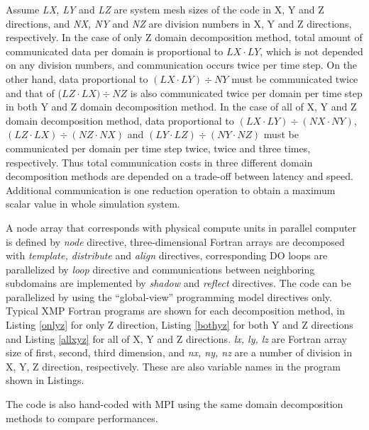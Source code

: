 \documentclass[graybox]{svmult}
\begin{document}
Assume {\it LX, LY} and {\it LZ} are system mesh sizes of the code in X, Y and Z directions, and {\it NX, NY} and {\it NZ} are division numbers in X, Y and Z directions, respectively. In the case of only Z domain decomposition method, total amount of communicated data per domain is proportional to $LX \cdot LY$, which is not depended on any division numbers, and communication occurs twice per time step. On the other hand, data proportional to $(LX \cdot LY) \div NY$ must be communicated twice and that of ($LZ \cdot LX) \div NZ$ is also communicated twice per domain per time step in both Y and Z domain decomposition method. In the case of all of X, Y and Z domain decomposition method, data proportional to $(LX \cdot LY) \div (NX \cdot NY)$,  $(LZ \cdot LX) \div (NZ \cdot NX)$ and $(LY \cdot LZ) \div (NY \cdot NZ)$ must be communicated per domain per time step twice, twice and three times, respectively. Thus total communication costs in three different domain decomposition methods are depended on a trade-off between latency and speed. Additional communication is one reduction operation to obtain a maximum scalar value in whole simulation system.

A node array that corresponds with physical compute units in parallel computer is defined by {\it node} directive, three-dimensional Fortran arrays are decomposed with {\it template, distribute} and {\it align} directives, corresponding DO loops are parallelized by {\it loop} directive and communications between neighboring subdomains are implemented by {\it shadow} and {\it reflect} directives. The code can be parallelized by using the ``global-view'' programming model directives only. Typical XMP Fortran programs are shown for each decomposition method,  in Listing \ref{onlyz} for only Z direction, Listing \ref{bothyz} for both Y and Z directions and Listing \ref{allxyz} for all of X, Y and Z directions.
{\it lx, ly, lz} are Fortran array size of first, second, third dimension, and {\it nx, ny, nz} are a number of division in X, Y, Z direction, respectively. These are also variable names in the program shown in Listings.

The code is also hand-coded with MPI using the same domain decomposition methods to compare performances.
\end{document}
